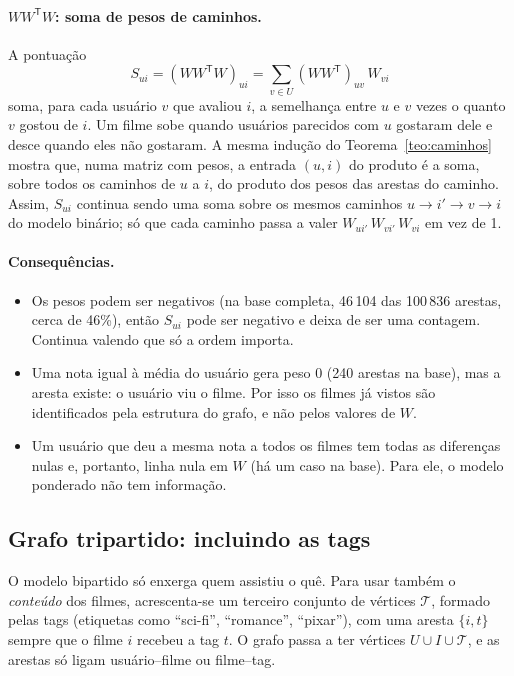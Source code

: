 \documentclass[12pt,a4paper]{article}
\theoremstyle{definition}
\begin{document}
\paragraph{$WW^{\mathsf T}W$: soma de pesos de caminhos.}
A pontuação
\[
  S_{ui} = (WW^{\mathsf T}W)_{ui} = \sum_{v \in U} (WW^{\mathsf T})_{uv}\, W_{vi}
\]
soma, para cada usuário $v$ que avaliou $i$, a semelhança entre $u$ e $v$
vezes o quanto $v$ gostou de $i$. Um filme sobe quando usuários parecidos
com $u$ gostaram dele e desce quando eles não gostaram. A mesma indução do
Teorema~\ref{teo:caminhos} mostra que, numa matriz com pesos, a entrada
$(u, i)$ do produto é a soma, sobre todos os caminhos de $u$ a $i$, do
produto dos pesos das arestas do caminho. Assim, $S_{ui}$ continua sendo
uma soma sobre os mesmos caminhos $u \to i' \to v \to i$ do modelo
binário; só que cada caminho passa a valer
$W_{ui'}\,W_{vi'}\,W_{vi}$ em vez de 1.

\paragraph{Consequências.}
\begin{itemize}
  \item Os pesos podem ser negativos (na base completa, 46\,104 das
        100\,836 arestas, cerca de 46\%), então $S_{ui}$ pode ser negativo e deixa de ser uma
        contagem. Continua valendo que só a ordem importa.
  \item Uma nota igual à média do usuário gera peso 0 (240 arestas na
        base), mas a aresta existe: o usuário viu o filme. Por isso os
        filmes já vistos são identificados pela estrutura do grafo, e não
        pelos valores de $W$.
  \item Um usuário que deu a mesma nota a todos os filmes tem todas as
        diferenças nulas e, portanto, linha nula em $W$ (há um caso na
        base). Para ele, o modelo ponderado não tem informação.
\end{itemize}

\subsection{Grafo tripartido: incluindo as tags}\label{sec:tripartido}

O modelo bipartido só enxerga quem assistiu o quê. Para usar também o
\emph{conteúdo} dos filmes, acrescenta-se um terceiro conjunto de vértices
$\mathcal{T}$, formado pelas tags (etiquetas como ``sci-fi'', ``romance'',
``pixar''), com uma aresta $\{i, t\}$ sempre que o filme $i$ recebeu a
tag $t$. O grafo passa a ter vértices $U \cup I \cup \mathcal{T}$, e as arestas só
ligam usuário--filme ou filme--tag.
\end{document}
